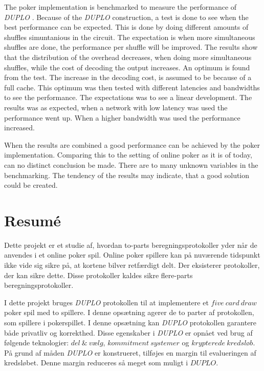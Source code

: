 \documentclass[twoside,11pt,openright]{report}
\newcommand{\DUPLO}{\textit{DUPLO} }
\begin{document}
The poker implementation is benchmarked to measure the performance of \DUPLO. Because of the \DUPLO construction, a test is done to see when the best performance can be expected. This is done by doing different amounts of shuffles simuntanious in the circuit. The expectation is when more simultaneous shuffles are done, the performance per shuffle will be improved. The results show that the distribution of the overhead decreases, when doing more simultaneous shuffles, while the cost of decoding the output increases. An optimum is found from the test. The increase in the decoding cost, is assumed to be because of a full cache. This optimum was then tested with different latencies and bandwidths to see the performance. The expectations was to see a linear development. The results was as expected, when a network with low latency was used the performance went up. When a higher bandwidth was used the performance increased.

When the results are combined a good performance can be achieved by the poker implementation. Comparing this to the setting of online poker as it is of today, can no distinct conclusion be made. There are to many unknown variables in the benchmarking. The tendency of the results may indicate, that a good solution could be created.


\chapter*{Resum\'e}

Dette projekt er et studie af, hvordan to-parts beregningsprotokoller yder når de anvendes i et online poker spil. Online poker spillere kan på nuværende tidspunkt ikke vide sig sikre på, at kortene bilver retfærdigt delt. Der eksisterer protokoller, der kan sikre dette. Disse protokoller kaldes sikre flere-parts beregningsprotokoller.

I dette projekt bruges \DUPLO protokollen til at implementere et $five~card~draw$ poker spil med to spillere. I denne opsætning agerer de to parter af protokollen, som spillere i pokerspillet. I denne opsætning kan \DUPLO protokollen garantere både privatliv og korrekthed. Disse egenskaber i \DUPLO er opnået ved brug af følgende teknologier: $del~\&~vælg$, $kommitment~systemer$ og $krypterede~kredsløb$. På grund af måden \DUPLO er konstrueret, tilføjes en margin til evalueringen af kredsløbet. Denne margin reduceres så meget som muligt i $DUPLO$. 
\end{document}
